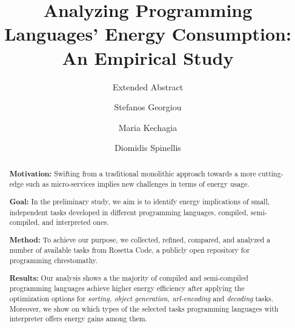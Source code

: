\documentclass[sigconf]{acmart}
\begin{document}
\title{Analyzing Programming Languages' Energy Consumption: An Empirical Study}
\subtitle{Extended Abstract}


\author{Stefanos Georgiou}

\author{Maria Kechagia}

\author{Diomidis Spinellis}


\renewcommand{\shortauthors}{S. Georgiou et al.}


\begin{abstract}
\noindent \textbf{Motivation:} Swifting from a traditional 
monolithic approach towards a more cutting-edge such as micro-services 
implies new challenges in terms of energy usage.

\noindent \textbf{Goal:} In the preliminary study, we aim is to 
identify energy implications of small, independent tasks developed 
in different programming languages, compiled, semi-compiled, and 
interpreted ones.

\noindent \textbf{Method:} To achieve our purpose, we collected, 
refined, compared, and analyzed a number of available tasks from Rosetta 
Code, a publicly open repository for programming chrestomathy. 

\noindent \textbf{Results:} Our analysis shows a the majority of 
compiled and semi-compiled programming languages achieve higher 
energy efficiency after applying the optimization options for 
\textit{sorting, object generation, url-encoding} and 
\textit{decoding} tasks. 
Moreover, we show on which types of the selected tasks programming 
languages with interpreter offers energy gains among them.

\end{abstract}
\end{document}
